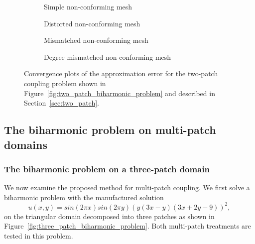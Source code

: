 \begin{figure}[ht]
	\captionsetup[subfigure]{labelformat=empty, font = footnotesize, justification=centering}
	\centering
	\begin{subfigure}[b]{0.47\textwidth}
		
		\caption{Simple non-conforming mesh}
		\vspace*{3mm}
	\end{subfigure}
	\hfill
	\begin{subfigure}[b]{0.47\textwidth}
		
		\caption{Distorted non-conforming mesh}
		\vspace*{3mm}
	\end{subfigure}
	\begin{subfigure}[b]{0.47\textwidth}
		
		\caption{Mismatched non-conforming mesh}
	\end{subfigure}
	\hfill
	\begin{subfigure}[b]{0.47\textwidth}
		
		\caption{Degree mismatched non-conforming mesh}
	\end{subfigure}
	\caption{Convergence plots of the approximation error for the two-patch coupling problem shown in Figure~\ref{fig:two_patch_biharmonic_problem} and described in Section~\ref{sec:two_patch}.}\label{fig:two_patch_best_approximation}
\end{figure}


\subsection{The biharmonic problem on multi-patch domains}
\subsubsection{The biharmonic problem on a three-patch domain}\label{sec:three-patch}
We now examine the proposed method for multi-patch coupling. We first solve a biharmonic problem with the manufactured solution
\begin{equation}
	u(x,y)=sin(2\pi{x})sin(2\pi{y})\left({y(3x-y)(3x+2y-9)}\right)^2,
\end{equation}
on the triangular domain decomposed into three patches as shown in Figure~\ref{fig:three_patch_biharmonic_problem}. Both multi-patch treatments are tested in this problem.

